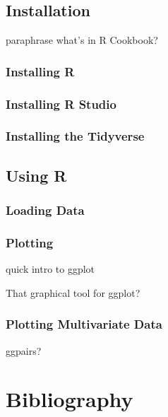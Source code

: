 \documentclass[]{article}
\begin{document}
\subsection{Installation}\label{installation}

paraphrase what's in R Cookbook?

\subsubsection{Installing R}\label{installing-r}

\subsubsection{Installing R Studio}\label{installing-r-studio}

\subsubsection{Installing the Tidyverse}\label{installing-the-tidyverse}

\subsection{Using R}\label{using-r}

\subsubsection{Loading Data}\label{loading-data}

\subsubsection{Plotting}\label{plotting}

quick intro to ggplot

That graphical tool for ggplot?

\subsubsection{Plotting Multivariate
Data}\label{plotting-multivariate-data}

ggpairs?

\section{Bibliography}\label{bibliography}

\textcite{R-knitr} \textcite{R-rmarkdown}

\printbibliography
\end{document}

